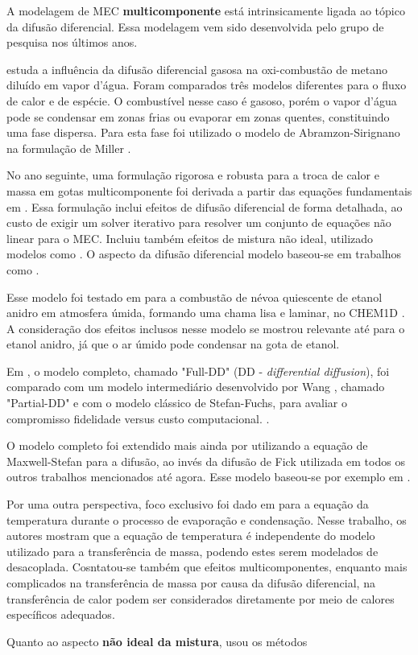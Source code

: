 
A modelagem de MEC \textbf{multicomponente} está intrinsicamente ligada ao tópico da difusão diferencial.
Essa modelagem vem sido desenvolvida pelo grupo de pesquisa nos últimos anos.

 estuda a influência da difusão diferencial gasosa na oxi-combustão de metano diluído em vapor d'água. 
Foram comparados três modelos diferentes para o fluxo de calor e de espécie.
O combustível nesse caso é gasoso, porém o vapor d'água pode se condensar em zonas frias ou evaporar em zonas quentes, constituindo uma fase dispersa.
Para esta fase foi utilizado o modelo de Abramzon-Sirignano \cite{Sirignano1989} na formulação de Miller \cite{MillerR1998}.

No ano seguinte, uma formulação rigorosa e robusta para a troca de calor e massa em gotas multicomponente foi derivada a partir das equações fundamentais em \cite{SacomanoF2022IJHMT}.
Essa formulação inclui efeitos de difusão diferencial de forma detalhada, ao custo de exigir um solver iterativo para resolver um conjunto de equações não linear para o MEC.
Incluiu também efeitos de mistura não ideal, utilizado modelos como .
O aspecto da difusão diferencial modelo baseou-se em trabalhos como \cite{ToniniS2015IJTS, ZhangL2012Fuel}. 

Esse modelo foi testado em \cite{SacomanoF2024CF} para a combustão de névoa quiescente de etanol anidro em atmosfera úmida, formando uma chama lisa e laminar, no CHEM1D \cite{Sommers1994PhD}.
A consideração dos efeitos inclusos nesse modelo se mostrou relevante até para o etanol anidro, já que o ar úmido pode condensar na gota de etanol.

Em \cite{SacomanoF2025CF}, o modelo completo, chamado "Full-DD" (DD - \emph{differential diffusion}), foi comparado com um modelo intermediário desenvolvido por Wang \cite{WangC2013CF}, chamado "Partial-DD" e com o modelo clássico de Stefan-Fuchs, para avaliar o compromisso fidelidade versus custo computacional.
.

O modelo completo foi extendido mais ainda por \cite{SantosA2024IJHMT} utilizando a equação de Maxwell-Stefan para a difusão, ao invés da difusão de Fick utilizada em todos os outros trabalhos mencionados até agora.
Esse modelo baseou-se por exemplo em \cite{ToniniS2015IJTS}.

Por uma outra perspectiva, foco exclusivo foi dado em \cite{SantosA2023IJHMT} para a equação da temperatura durante o processo de evaporação e condensação.
Nesse trabalho, os autores mostram que a equação de temperatura é independente do modelo utilizado para a transferência de massa, podendo estes serem modelados de desacoplada.
Cosntatou-se também que efeitos multicomponentes, enquanto mais complicados na transferência de massa por causa da difusão diferencial, na transferência de calor podem ser considerados diretamente por meio de calores específicos adequados.

Quanto ao aspecto \textbf{não ideal da mistura},  usou os métodos 